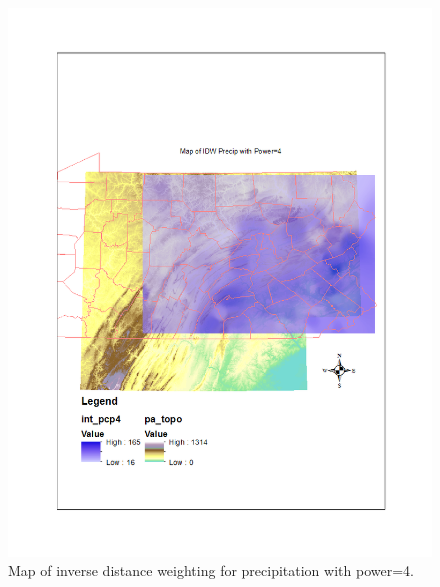 \documentclass{article}\usepackage[]{graphicx}\usepackage[]{color}
\begin{document}
\begin{figure}
\includegraphics[scale=.9]{./figure/IDWprecip4}
\caption{Map of inverse distance weighting for precipitation with power=4.}
\label{IDWprecip4}
\end{figure}
\end{document}
